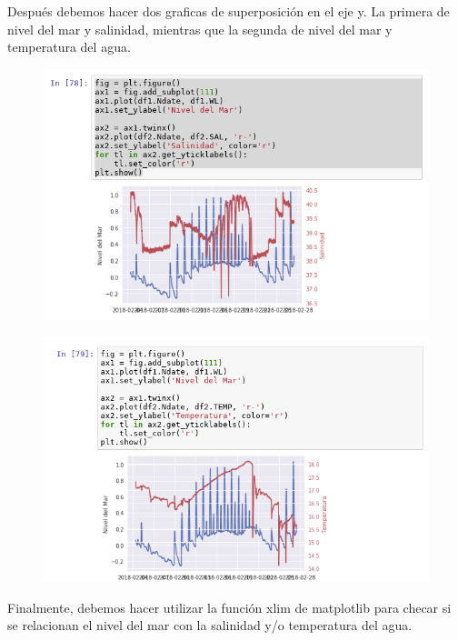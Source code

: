 \documentclass{article}
\begin{document}
Después debemos hacer dos graficas de superposición en el eje y. La primera de nivel del mar y salinidad, mientras que la segunda de nivel del mar y temperatura del agua.\\
\begin{figure}[H]
	\centering
    \includegraphics[width=\linewidth]{tw1.png}\\
\end{figure}
\begin{figure}[H]
	\centering
    \includegraphics[width=\linewidth]{tw2.png}\\
\end{figure}
Finalmente, debemos hacer utilizar la función xlim de matplotlib para checar si se relacionan el nivel del mar con la salinidad y/o temperatura del agua.\\
\end{document}
